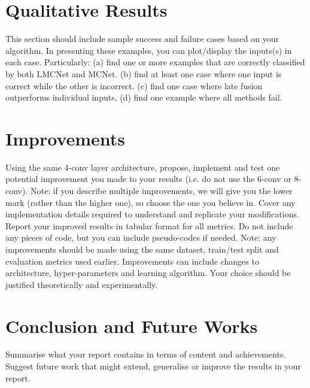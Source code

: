 \documentclass[conference]{IEEEtran}
\begin{document}
\section{Qualitative Results}
This section should include sample success and failure cases based on your algorithm. In presenting these examples, you can plot/display the inputs(s) in each case. Particularly: (a) find one or more examples that are correctly classified by both LMCNet and MCNet. (b) find at least one case where one input is correct while the other is incorrect. (c) find one case where late fusion outperforms individual inputs, (d) find one example where all methods fail. 

\section{Improvements}
Using the same 4-conv layer architecture, propose, implement and test one potential improvement you made to your results (i.e. do not use the 6-conv or 8-conv). Note: if you describe multiple improvements, we will give you the lower mark (rather than the higher one), so choose the one you believe in. Cover any implementation details required to understand and replicate your modifications. Report your improved results in tabular format for all metrics. Do not include any pieces of code, but you can include pseudo-codes if needed. Note: any improvements should be made using the same dataset, train/test split and evaluation metrics used earlier. Improvements can include changes to architecture, hyper-parameters and learning algorithm. Your choice should be justified theoretically and experimentally. 

\section{Conclusion and Future Works}
Summarise what your report contains in terms of content and achievements. 
Suggest future work that might extend, generalise or improve the results in your report. 



\end{document}
